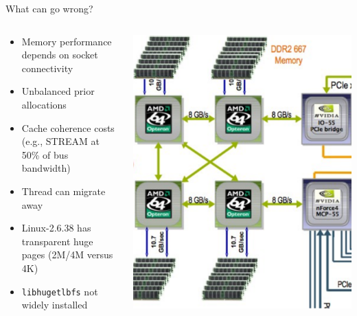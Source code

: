 \documentclass{beamer}
\begin{document}
\begin{frame}{What can go wrong?}
  \begin{columns}
    \begin{column}{0.4\textwidth}
      \begin{itemize} \small
      \item Memory performance depends on socket connectivity
      \item Unbalanced prior allocations
      \item Cache coherence costs (e.g., STREAM at 50\% of bus bandwidth)
      \item Thread can migrate away
      \item Linux-2.6.38 has transparent huge pages (2M/4M versus 4K)
      \item \texttt{libhugetlbfs} not widely installed
      \end{itemize}
    \end{column}
    \begin{column}{0.6\textwidth}
      \includegraphics[width=\textwidth]{figures/hardware/AMDMemory}
    \end{column}
  \end{columns}
\end{frame}
\end{document}
